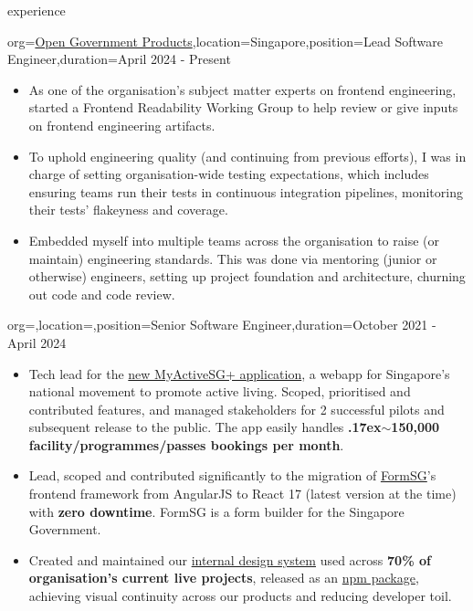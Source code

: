 \documentclass{resume}
\newcommand{\mytilde}{\raise.17ex\hbox{$\scriptstyle\mathtt{\sim}$}}
\begin{document}
\makeheader

\begin{ResumeSection}{experience}
    \begin{ResumeSubsection}{org=\href{https://open.gov.sg}{Open Government Products},location={Singapore},position={Lead Software Engineer},duration=April 2024 - Present}
        \begin{itemize} 
            \item As one of the organisation's subject matter experts on frontend engineering, started a Frontend Readability Working Group to help review or give inputs on frontend engineering artifacts. 
            \item To uphold engineering quality (and continuing from previous efforts), I was in charge of setting organisation-wide testing expectations, which includes ensuring teams run their tests in continuous integration pipelines, monitoring their tests' flakeyness and coverage.
            \item Embedded myself into multiple teams across the organisation to raise (or maintain) engineering standards. This was done via mentoring (junior or otherwise) engineers, setting up project foundation and architecture, churning out code and code review.
        \end{itemize}
        \medskip
    \end{ResumeSubsection}
    \begin{ResumeSubsection}{org=,location=,position={Senior Software Engineer},duration=October 2021 - April 2024}
        \begin{itemize}
            \item Tech lead for the \href{https://activesg.gov.sg/}{new MyActiveSG+ application}, a webapp for Singapore's national movement to promote active living. Scoped, prioritised and contributed features, and managed stakeholders for 2 successful pilots and subsequent release to the public. The app easily handles \textbf{\mytilde150,000 facility/programmes/passes bookings per month}.
            \item Lead, scoped and contributed significantly to the migration of \href{https://github.com/opengovsg/FormSG}{FormSG}'s frontend framework from AngularJS to React 17 (latest version at the time) with \textbf{zero downtime}. FormSG is a form builder for the Singapore Government.
            \item Created and maintained our \href{https://design.open.gov.sg/}{internal design system} used across \textbf{70\% of organisation's current live projects}, released as an \href{https://www.npmjs.com/package/@opengovsg/design-system-react}{npm package}, achieving visual continuity across our products and reducing developer toil.

\end{itemize}
\end{ResumeSubsection}
\end{ResumeSection}
\end{document}
